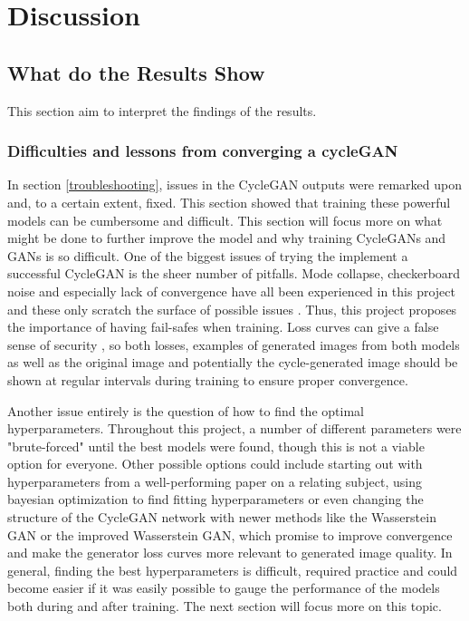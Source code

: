 \documentclass[12pt, fleqn, titlepage]{article}
\newcommand{\1}[1]{\mathds{1}\left[#1\right]}
\begin{document}
\section{Discussion}\label{discussion}

\subsection{What do the Results Show}\label{discussionOfResults}
This section aim to interpret the findings of the results. 

\subsubsection{Difficulties and lessons from converging a cycleGAN}
In section \ref{troubleshooting}, issues in the CycleGAN outputs were remarked upon and, to a certain extent, fixed. This section showed that training these powerful models can be cumbersome and difficult. This section will focus more on what might be done to further improve the model and why training CycleGANs and GANs is so difficult. One of the biggest issues of trying the implement a successful CycleGAN is the sheer number of pitfalls. Mode collapse, checkerboard noise and especially lack of convergence have all been experienced in this project and these only scratch the surface of possible issues \cite{hard_to_train, mode_collapse_MLM}. Thus, this project proposes the importance of having fail-safes when training. Loss curves can give a false sense of security \cite{towardsdatascience_losses, better_cycles_losses}, so both losses, examples of generated images from both models as well as the original image and potentially the cycle-generated image should be shown at regular intervals during training to ensure proper convergence.

Another issue entirely is the question of how to find the optimal hyperparameters. Throughout this project, a number of different parameters were "brute-forced" until the best models were found, though this is not a viable option for everyone. Other possible options could include starting out with hyperparameters from a well-performing paper on a relating subject, using bayesian optimization\cite{bayesian_optimization} to find fitting hyperparameters or even changing the structure of the CycleGAN network with newer methods like the Wasserstein GAN\cite{wasserstein_gan} or the improved Wasserstein GAN\cite{wasserstein_gan_improved}, which promise to improve convergence and make the generator loss curves more relevant to generated image quality. In general, finding the best hyperparameters is difficult, required practice and could become easier if it was easily possible to gauge the performance of the models both during and after training. The next section will focus more on this topic.
\end{document}
